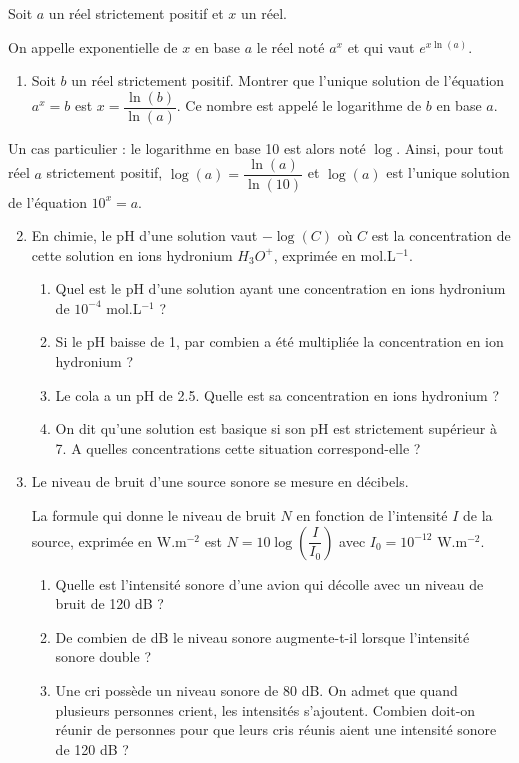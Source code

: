 \documentclass[11pt,fleqn, openany]{book} %
\begin{document}
\begin{exercise}[subtitle={(Logarithme décimal et applications)}] Soit $a$ un réel strictement positif et $x$ un réel. 

On appelle exponentielle de $x$ en base $a$ le réel noté $a^x$ et qui vaut $e^{x \ln(a)}$.
\begin{enumerate}
\item Soit $b$ un réel strictement positif. Montrer que l'unique solution de l'équation $a^x=b$ est $x=\dfrac{\ln(b)}{\ln(a)}$. Ce nombre est appelé le logarithme de $b$ en base $a$.\end{enumerate}
Un cas particulier : le logarithme en base 10 est alors noté $\log$. Ainsi, pour tout réel $a$ strictement positif, $\log(a)=\dfrac{\ln(a)}{\ln(10)}$ et $\log(a)$ est l'unique solution de l'équation $10^x=a$.

\begin{enumerate}
\setcounter{enumi}{1}
\item En chimie, le pH d'une solution vaut $-\log(C)$ où $C$ est la concentration de cette solution en ions hydronium $H_3O^+$, exprimée en mol.L$^{-1}$.
\begin{enumerate}
\item Quel est le pH d'une solution ayant une concentration en ions hydronium de $10^{-4}$ mol.L$^{-1}$ ?
\item Si le pH baisse de 1, par combien a été multipliée la concentration en ion hydronium ?
\item Le cola a un pH de 2.5. Quelle est sa concentration en ions hydronium ?
\item On dit qu'une solution est basique si son pH est strictement supérieur à 7. A quelles concentrations cette situation correspond-elle ?
\end{enumerate}
\item Le niveau de bruit d'une source sonore se mesure en décibels. 

La formule qui donne le niveau de bruit $N$ en fonction de l'intensité $I$ de la source, exprimée en W.m$^{-2}$ est $N=10\log\left(\dfrac{I}{I_0}\right)$ avec $I_0=10^{-12}$ W.m$^{-2}$.
\begin{enumerate}
\item Quelle est l'intensité sonore d'une avion qui décolle avec un niveau de bruit de 120 dB ?
\item De combien de dB le niveau sonore augmente-t-il lorsque l'intensité sonore double ?
\item Une cri possède un niveau sonore de 80 dB. On admet que quand plusieurs personnes crient, les intensités s'ajoutent. Combien doit-on réunir de personnes pour que leurs cris réunis aient une intensité sonore de 120 dB ?
\end{enumerate}
\end{enumerate}

\end{exercise}
\end{document}
